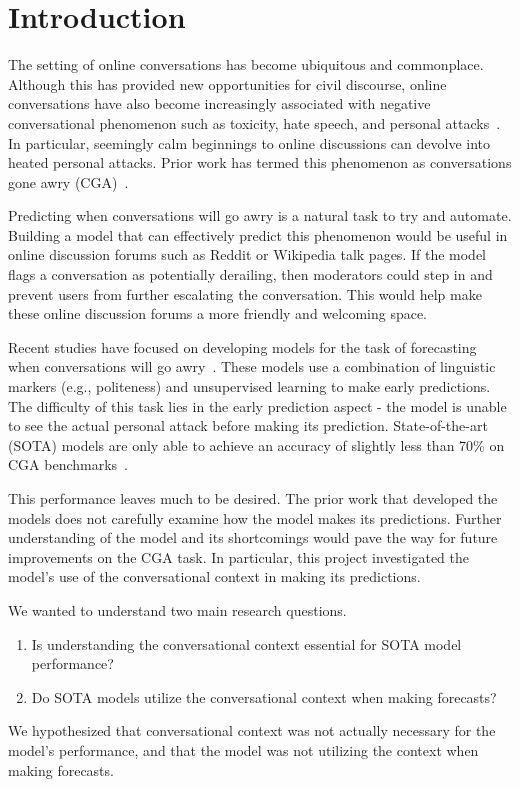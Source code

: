 \section{Introduction}
The setting of online conversations has become ubiquitous and commonplace. 
Although this has provided new opportunities for civil discourse, online conversations have also become increasingly associated with negative conversational phenomenon such as toxicity, hate speech, and personal attacks~\citep{Cheng_Danescu-Niculescu-Mizil_Leskovec_2021}.
In particular, seemingly calm beginnings to online discussions can devolve into heated personal attacks. 
Prior work has termed this phenomenon as conversations gone awry (CGA)~\citep{zhang-etal-2018-conversations, chang-danescu-niculescu-mizil-2019-trouble}.

Predicting when conversations will go awry is a natural task to try and automate. 
Building a model that can effectively predict this phenomenon would be useful in online discussion forums such as Reddit or Wikipedia talk pages. 
If the model flags a conversation as potentially derailing, then moderators could step in and prevent users from further escalating the conversation. 
This would help make these online discussion forums a more friendly and welcoming space. 

Recent studies have focused on developing models for the task of forecasting when conversations will go awry~\citep{zhang-etal-2018-conversations, chang-danescu-niculescu-mizil-2019-trouble, Yuan_Singh_2023}. 
These models use a combination of linguistic markers (e.g., politeness) and unsupervised learning to make early predictions. 
The difficulty of this task lies in the early prediction aspect - the model is unable to see the actual personal attack before making its prediction. 
State-of-the-art (SOTA) models are only able to achieve an accuracy of slightly less than 70\% on CGA benchmarks~\citep{zhang-etal-2018-conversations, chang-danescu-niculescu-mizil-2019-trouble, Yuan_Singh_2023}. 

This performance leaves much to be desired. 
The prior work that developed the models does not carefully examine how the model makes its predictions. 
Further understanding of the model and its shortcomings would pave the way for future improvements on the CGA task. 
In particular, this project investigated the model's use of the conversational context in making its predictions. 

We wanted to understand two main research questions.
\begin{enumerate}
    \item Is understanding the conversational context essential for SOTA model performance?
    \item Do SOTA models utilize the conversational context when making forecasts?
\end{enumerate}
We hypothesized that conversational context was not actually necessary for the model's performance, and that the model was not utilizing the context when making forecasts. 

